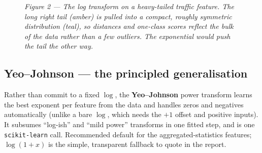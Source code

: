 \documentclass[11pt,a4paper]{article}
\begin{document}
\begin{figure}[H]
\centering
{}
\caption*{\small\textit{Figure 2 --- The log transform on a heavy-tailed traffic feature. The long right tail (amber) is pulled into a compact, roughly symmetric distribution (teal), so distances and one-class scores reflect the bulk of the data rather than a few outliers. The exponential would push the tail the other way.}}
\end{figure}

\subsection{Yeo--Johnson --- the principled generalisation}
Rather than commit to a fixed $\log$, the \textbf{Yeo--Johnson} power transform learns the best exponent per feature from the data and handles zeros and negatives automatically (unlike a bare $\log$, which needs the $+1$ offset and positive inputs). It subsumes ``log-ish'' and ``mild power'' transforms in one fitted step, and is one \texttt{scikit-learn} call. Recommended default for the aggregated-statistics features; $\log(1+x)$ is the simple, transparent fallback to quote in the report.
\end{document}
